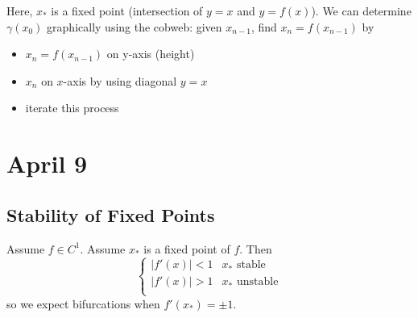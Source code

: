 \documentclass[12pt]{report}
\newcommand{\abs}[1]{\left\vert #1 \right\vert}
\begin{document}
Here, $x_*$ is a fixed point (intersection of $y = x$ and $y = f(x)$). We can determine $\gamma(x_0)$ graphically using the cobweb: given $x_{n-1}$, find $x_n = f(x_{n-1})$ by
\begin{itemize}
    \item $x_n = f(x_{n-1})$ on y-axis (height)
    \item $x_n$ on $x$-axis by using diagonal $y =x$
    \item iterate this process
\end{itemize}

\section{April 9}
\subsection{Stability of Fixed Points}

Assume $f \in C^1$. Assume $x_*$ is a fixed point of $f$. Then
\[\begin{cases}
        \abs{f'(x)} < 1 & x_* \text{ stable}   \\
        \abs{f'(x)} > 1 & x_* \text{ unstable} \\
    \end{cases}\]
so we expect bifurcations when $f'(x_*) = \pm 1$.
\end{document}
